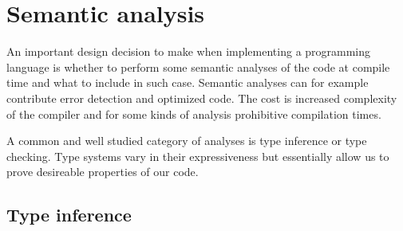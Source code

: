 \section{Semantic analysis}


An important design decision to make when implementing a programming language is whether to perform some semantic analyses of the code at compile time and what to include in such case. Semantic analyses can for example contribute error detection and optimized code. The cost is increased complexity of the compiler and for some kinds of analysis prohibitive compilation times.

A common and well studied category of analyses is type inference or type checking. Type systems vary in their expressiveness but essentially allow us to prove desireable properties of our code.



\subsection{Type inference}









